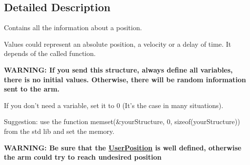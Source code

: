 \subsection{Detailed Description}
\par
Contains all the information about a position. \par
Values could represent an absolute position, a velocity or a delay of time. It depends of the called function. \par
{\bfseries W\-A\-R\-N\-I\-N\-G\-: If you send this structure, always define all variables, there is no initial values. Otherwise, there will be random information sent to the arm.} \par
If you don't need a variable, set it to 0 (It's the case in many situations). \par
Suggestion\-: use the function memset(\&your\-Structure, 0, sizeof(your\-Structure)) from the std lib and set the memory. \par
{\bfseries W\-A\-R\-N\-I\-N\-G\-: Be sure that the \hyperlink{struct_user_position}{User\-Position} is well defined, otherwise the arm could try to reach undesired position} 



